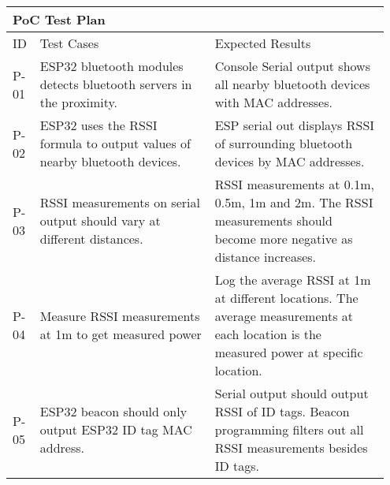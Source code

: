 \begin{table}[h!]
    \centering
    
    \begin{tabular}{|m{0.05\linewidth}|m{0.45\linewidth}|m{0.45\linewidth}|} 
    \hline
    \multicolumn{3}{|l|}{\textbf{PoC Test Plan}}  \\ 
    \hline
    ID & Test Cases & Expected Results\\ 
    \hline
    
    P-01
    & ESP32 bluetooth modules detects bluetooth servers in the proximity.  
    & Console Serial output shows all nearby bluetooth devices with MAC addresses. \\ 
    \hline    

    P-02
    & ESP32 uses the RSSI formula to output values of nearby bluetooth devices.
    & ESP serial out displays RSSI of surrounding bluetooth devices by MAC addresses. \\ 
    \hline

    P-03
    & RSSI measurements on serial output should vary at different distances.
    & RSSI measurements at 0.1m, 0.5m, 1m and 2m. The RSSI measurements should become more negative as distance increases.\\ 
    \hline

    P-04
    & Measure RSSI measurements at 1m to get measured power
    & Log the average RSSI at 1m at different locations. The average measurements at each location is the measured power at specific location. \\ 
    \hline
    
    P-05
    & ESP32 beacon should only output ESP32 ID tag MAC address.
    & Serial output should output RSSI of ID tags. Beacon programming filters out all RSSI measurements besides ID tags.\\ 
    \hline


\end{tabular}
\end{table}
